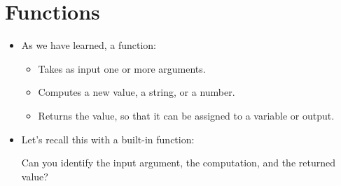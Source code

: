 \documentclass[letterpaper,10pt,english]{sphinxmanual}
\begin{document}
\section{Functions}
\label{\detokenize{lecture_notes/lec05_functions2:functions}}\begin{itemize}
\item {} 
As we have learned, a function:
\begin{itemize}
\item {} 
Takes as input one or more arguments.

\item {} 
Computes a new value, a string, or a number.

\item {} 
Returns the value, so that it can be assigned to a variable or
output.

\end{itemize}

\item {} 
Let’s recall this with a built-in function:

\begin{sphinxVerbatim}[commandchars=\\\{\}]
\end{sphinxVerbatim}

Can you identify the input argument, the computation, and the
returned value?

\end{itemize}
\end{document}
